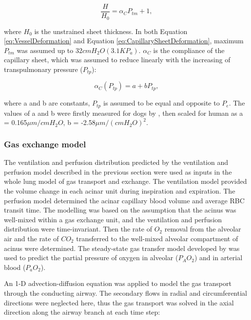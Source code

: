 \begin{equation}
 \label{eq:CapillarySheetDeformation}
 \frac{H}{H_0} = \alpha_C P_{tm} + 1,
\end{equation}

\noindent where $H_0$ is the unstrained sheet thickness. In both Equation \ref{eq:VesselDeformation} and Equation \ref{eq:CapillarySheetDeformation}, maximum $P_{tm}$ was assumed up to $32cmH_2 O(3.1KP_a)$. $\alpha_C$ is the compliance of the capillary sheet, which was assumed to reduce linearly with the increasing of transpulmonary pressure ($P_{tp}$):

\begin{equation} 
 \label{eq:CapillaryCompliance}
 \alpha_C(P_{tp}) = a + bP_{tp},
\end{equation}

\noindent where a and b are constants, $P_{tp}$ is assumed to be equal and opposite to $P_e$. The values of a and b were firstly measured for dogs by \cite{glazier1969measurements}, then scaled for human as a = 0.165$\mu m/cmH_2O$, b = -2.58$\mu m/{(cmH_2O)}^2$.

\subsubsection{Gas exchange model}
The ventilation and perfusion distribution predicted by the ventilation and perfusion model described in the previous section were used as inputs in the whole lung model of gas transport and exchange. The ventilation model provided the volume change in each acinar unit during inspiration and expiration. The perfusion model determined the acinar capillary blood volume and average RBC transit time. The modelling was based on the assumption that the acinus was well-mixed within a gas exchange unit, and the ventilation and perfusion distribution were time-invariant. Then the rate of $O_2$ removal from the alveolar air and the rate of $CO_2$ transferred to the well-mixed alveolar compartment of acinus were determined. The steady-state gas transfer model developed by \cite{kapitan1986computer, swan2010multi} was used to predict the partial pressure of oxygen in alveolar ($P_AO_2$) and in arterial blood ($P_aO_2$).

An 1-D advection-diffusion equation was applied to model the gas transport through the conducting airway. The secondary flows in radial and circumferential directions were neglected here, thus the gas transport was solved in the axial direction along the airway branch at each time step:

